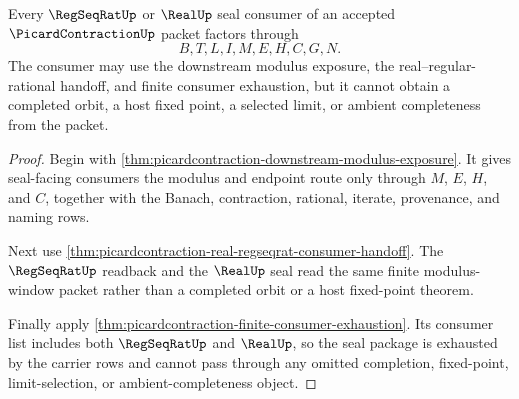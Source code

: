 \begin{theorem}
\label{thm:picardcontraction-regseqrat-real-seal-package}
Every $\RegSeqRatUp$ or $\RealUp$ seal consumer of an accepted $\PicardContractionUp$ packet factors through
$$
B,T,L,I,M,E,H,C,G,N.
$$
The consumer may use the downstream modulus exposure, the real--regular-rational handoff, and finite consumer exhaustion, but it cannot obtain a completed orbit, a host fixed point, a selected limit, or ambient completeness from the packet.
\end{theorem}
\begin{proof}
Begin with \autoref{thm:picardcontraction-downstream-modulus-exposure}. It gives seal-facing consumers the modulus and endpoint route only through $M$, $E$, $H$, and $C$, together with the Banach, contraction, rational, iterate, provenance, and naming rows.

Next use \autoref{thm:picardcontraction-real-regseqrat-consumer-handoff}. The $\RegSeqRatUp$ readback and the $\RealUp$ seal read the same finite modulus-window packet rather than a completed orbit or a host fixed-point theorem.

Finally apply \autoref{thm:picardcontraction-finite-consumer-exhaustion}. Its consumer list includes both $\RegSeqRatUp$ and $\RealUp$, so the seal package is exhausted by the carrier rows and cannot pass through any omitted completion, fixed-point, limit-selection, or ambient-completeness object.
\end{proof}

